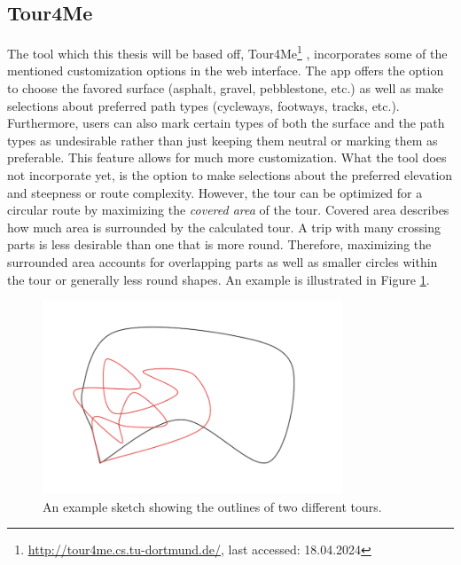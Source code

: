 \subsection{Tour4Me}
\label{subsec:Tour4Me}

The tool which this thesis will be based off, Tour4Me\footnote{\url{http://tour4me.cs.tu-dortmund.de/}, last accessed: 18.04.2024} \cite{buchin_tour4me_2022}, incorporates some of the mentioned customization options in the web interface. 
The app offers the option to choose the favored surface (asphalt, gravel, pebblestone, etc.) as well as make selections about preferred path types (cycleways, footways, tracks, etc.).
Furthermore, users can also mark certain types of both the surface and the path types as undesirable rather than just keeping them neutral or marking them as preferable.
This feature allows for much more customization.
What the tool does not incorporate yet, is the option to make selections about the preferred elevation and steepness or route complexity.
However, the tour can be optimized for a circular route by maximizing the \textit{covered area} of the tour.
Covered area describes how much area is surrounded by the calculated tour. 
A trip with many crossing parts is less desirable than one that is more round.
Therefore, maximizing the surrounded area accounts for overlapping parts as well as smaller circles within the tour or generally less round shapes.
An example is illustrated in Figure \ref{fig:coveredAreaSketch}. 

\begin{figure}
	\begin{centering}
		\includegraphics[width=0.8\textwidth]{bilder/CoveredAreaSketch.png}
		\caption{An example sketch showing the outlines of two different tours.}
		\label{fig:coveredAreaSketch}
	\end{centering}
\end{figure}

